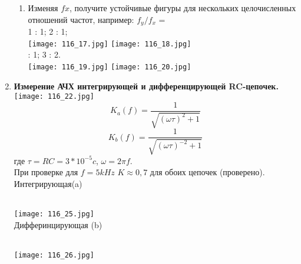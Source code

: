 \documentclass[a4paper, 12pt]{article}%
\begin{document}
\begin{enumerate}
\begin{enumerate}
\item Изменяя $fx$, получите устойчивые фигуры для нескольких целочисленных отношений частот, например: $f_y / f_x$ = \\
1 : 1; 2 : 1;\\
\texttt{[image: 116\_17.jpg]}
\texttt{[image: 116\_18.jpg]}\\
 : 1; 3 : 2.\\
\texttt{[image: 116\_19.jpg]}
\texttt{[image: 116\_20.jpg]}
\end{enumerate}
\item
\textbf{Измерение АЧХ интегрирующей и дифференцирующей
RC-цепочек.} \\
\texttt{[image: 116\_22.jpg]} \\
\[K_a(f) = \dfrac{1}{\sqrt{(\omega \tau)^2 + 1}} \]
\[K_b(f) = \dfrac{1}{\sqrt{(\omega \tau)^{-2} + 1}} \]
где $\tau = RC = 3*10^{-5} c$, $\omega = 2 \pi f$.\\
При проверке для $f = 5kHz$ $K \approx 0,7$ для обоих цепочек (проверено).
\newpage
Интегрирующая(a)
\begin{figure}[h]
\end{figure}\\
\texttt{[image: 116\_25.jpg]}\\
\newpage
Дифферинцирующая (b)
\begin{figure}[h]
\end{figure} \\
\texttt{[image: 116\_26.jpg]}\\
\end{enumerate}
\end{document}
